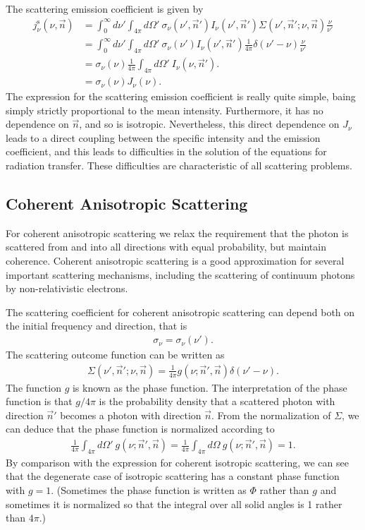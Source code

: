 The scattering emission coefficient is given by
\begin{align}
j_\nu^\mathrm{s}(\nu,\vec n) 
&=
\int_0^\infty \!\!\! d\nu' 
\int_{4\pi} \!\!\! d\Omega'
\:
\sigma_\nu(\nu', \vec n')
I_\nu(\nu', \vec n')
\Sigma(\nu', \vec n'; \nu, \vec n)
\frac{\nu}{\nu'}\\
&=
\int_0^\infty \!\!\! d\nu' 
\int_{4\pi} \!\!\! d\Omega'
\:
\sigma_\nu(\nu')
I_\nu(\nu', \vec n')
\frac{1}{4\pi} 
\delta(\nu'-\nu) 
\frac{\nu}{\nu'}
\\
&=
\sigma_\nu(\nu)
\frac{1}{4\pi} 
\int_{4\pi} \!\!\! d\Omega'
\:
I_\nu(\nu, \vec n').
\\
&=
\sigma_\nu(\nu)
J_\nu(\nu).
\end{align}
The expression for the scattering emission coefficient is
really quite simple, baing simply strictly proportional to
the mean intensity. Furthermore, it has no dependence on
$\vec n$, and so is isotropic. Nevertheless, this direct
dependence on $J_\nu$ leads to a direct coupling between the
specific intensity and the emission coefficient, and this
leads to difficulties in the solution of the equations for
radiation transfer. These difficulties are characteristic of
all scattering problems.

\subsection{Coherent Anisotropic Scattering}

For coherent anisotropic scattering we relax the requirement
that the photon is scattered from and into all directions
with equal probability, but maintain coherence. Coherent
anisotropic scattering is a good approximation for several
important scattering mechanisms, including the scattering of
continuum photons by non-relativistic electrons.

The scattering coefficient for coherent anisotropic
scattering can depend both on the initial frequency and
direction, that is
\begin{align}
\sigma_\nu = \sigma_\nu(\nu').
\end{align}
The scattering outcome function can be written as
\begin{align}
\Sigma(\nu', \vec n'; \nu, \vec n)
= 
\frac{1}{4\pi} 
g(\nu; \vec n', \vec n)
\delta(\nu' - \nu) .
\end{align}
The function $g$ is known as the phase function. 
The interpretation of the phase function is that $g/4\pi$ is
the probability density that a scattered photon with
direction $\vec n'$ becomes a photon with direction $\vec
n$.
From the
normalization of $\Sigma$, we can deduce that the phase
function is normalized according to
\begin{align}
\frac{1}{4\pi} 
\int_{4\pi} \!\!\! d\Omega'
\:
g(\nu; \vec n', \vec n) 
=
\frac{1}{4\pi} 
\int_{4\pi} \!\!\! d\Omega
\:
g(\nu; \vec n', \vec n) 
=
1.
\end{align}
By comparison with the expression for coherent isotropic
scattering, we can see that the degenerate case of
isotropic scattering has a constant phase function with $g =
1$. (Sometimes the phase function is written as $\Phi$
rather than $g$ and sometimes it is normalized so that the
integral over all solid angles is 1 rather than $4\pi$.)

